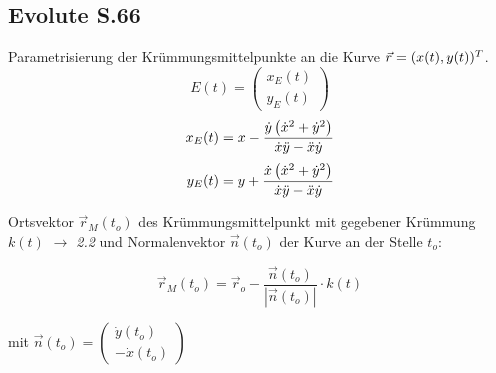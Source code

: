 \subsection{Evolute \texorpdfstring{\hfill S.66}{S.66}}
    Parametrisierung der Krümmungsmittelpunkte an die Kurve $\vec{r} = (x(t), y(t))^T$.
    $$
        E(t) = 
        \begin{pmatrix}
            x_E(t)\\y_E(t)
        \end{pmatrix}
    $$
    \begin{align*}
        x_E(t) &= x - \frac{\dot{y} \left( \dot{x}^2 + \dot{y}^2 \right)}{\dot{x} \ddot{y} - \ddot{x} \dot{y}}\\[0.25em]
        y_E(t) &= y + \frac{\dot{x} \left( \dot{x}^2 + \dot{y}^2 \right)}{\dot{x} \ddot{y} - \ddot{x} \dot{y}}
    \end{align*}\vspace{3pt}
    
    Ortsvektor $\Vec{r}_M(t_o)$ des Krümmungsmittelpunkt mit gegebener Krümmung $k(t)$ \textit{$\rightarrow$ 2.2} und Normalenvektor $\Vec{n}(t_o)$ der Kurve an der Stelle $t_o$:
    
    $$ \Vec{r}_M(t_o) = \Vec{r}_o - \frac{\Vec{n}(t_o)}{|\Vec{n}(t_o)|} \cdot k(t) $$
    
    \vspace{3pt}
    
    mit $\Vec{n}(t_o) = \begin{pmatrix}
        \Dot{y}(t_o) \\ -\Dot{x}(t_o) 
    \end{pmatrix}$
